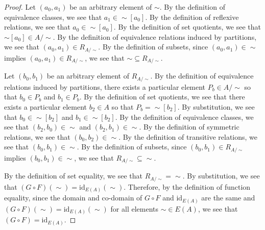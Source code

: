 \documentclass{amsart}
\newcommand{\id}[1]{\mathrm{id}_{#1}}
\numberwithin{equation}{section}
\begin{document}
\begin{problem}[manual-num=56]
\begin{enumerate}
\begin{proof}
				Let $(a_0, a_1)$ be an arbitrary element of $\sim$.
				By the definition of equivalence classes, we see that $a_1 \in \sim [a_0]$.
				By the definition of reflexive relations, we see that $a_0 \in \sim [a_0]$.
				By the definition of set quotients, we see that $\sim [a_0] \in A / \sim$.
				By the definition of equivalence relations induced by partitions, we see that $(a_0, a_1) \in R_{A / \sim}$.
				By the definition of subsets, since $(a_0, a_1) \in \sim$ implies $(a_0, a_1) \in R_{A / \sim}$, we see that $\sim \subseteq R_{A / \sim}$.

				Let $(b_0, b_1)$ be an arbitrary element of $R_{A / \sim}$.
				By the definition of equivalence relations induced by partitions, there exists a particular element $P_b \in A / \sim$ so that $b_0 \in P_b$ and $b_1 \in P_b$.
				By the definition of set quotients, we see that there exists a particular element $b_2 \in A$ so that $P_b = \sim [b_2]$.
				By substitution, we see that $b_0 \in \sim [b_2]$ and $b_1 \in \sim [b_2]$.
				By the definition of equivalence classes, we see that $(b_2, b_0) \in \sim$ and $(b_2, b_1) \in \sim$.
				By the definition of symmetric relations, we see that $(b_0, b_2) \in \sim$.
				By the definition of transitive relations, we see that $(b_0, b_1) \in \sim$.
				By the definition of subsets, since $(b_0, b_1) \in R_{A / \sim}$ implies $(b_0, b_1) \in \sim$, we see that $R_{A / \sim} \subseteq \sim$.

				By the definition of set equality, we see that $R_{A / \sim} = \sim$.
				By substitution, we see that $(G \circ F)(\sim) = \id{E(A)}(\sim)$.
				Therefore, by the definition of function equality, since the domain and co-domain of $G \circ F$ and $\id{E(A)}$ are the same and  $(G \circ F)(\sim) = \id{E(A)}(\sim)$ for all elements $\sim \in E(A)$, we see that $(G \circ F) = \id{E(A)}$.
			\end{proof}
		\end{enumerate}
	\end{problem}
\end{document}
